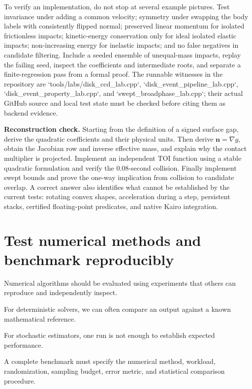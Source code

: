 To verify an implementation, do not stop at several example pictures. Test invariance under adding a common velocity; symmetry under swapping the body labels with consistently flipped normal; preserved linear momentum for isolated frictionless impacts; kinetic-energy conservation only for ideal isolated elastic impacts; non-increasing energy for inelastic impacts; and no false negatives in candidate filtering. Include a seeded ensemble of unequal-mass impacts, replay the failing seed, inspect the coefficients and intermediate roots, and separate a finite-regression pass from a formal proof. The runnable witnesses in the repository are `tools/labs/disk\_ccd\_lab.cpp`, `disk\_event\_pipeline\_lab.cpp`, `disk\_event\_property\_lab.cpp`, and `swept\_broadphase\_lab.cpp`; their actual GitHub source and local test state must be checked before citing them as backend evidence.

\textbf{Reconstruction check.} Starting from the definition of a signed surface gap, derive the quadratic coefficients and their physical units. Then derive \(\mathbf n=\nabla g\), obtain the Jacobian row and inverse effective mass, and explain why the contact multiplier is projected. Implement an independent TOI function using a stable quadratic formulation and verify the 0.08-second collision. Finally implement swept bounds and prove the one-way implication from collision to candidate overlap. A correct answer also identifies what cannot be established by the current tests: rotating convex shapes, acceleration during a step, persistent stacks, certified floating-point predicates, and native Kairo integration.

\section{Test numerical methods and benchmark reproducibly}\label{02-foundations-ii-ch031-test-numerical-methods-and-benchmark-reproducibly}

\hypertarget{02-foundations-ii-ch031-test-numerical-methods-and-benchmark-reproducibly}{}

Numerical algorithms should be evaluated using experiments that others can reproduce and independently inspect.

For deterministic solvers, we can often compare an output against a known mathematical reference.

For stochastic estimators, one run is not enough to establish expected performance.

A complete benchmark must specify the numerical method, workload, randomization, sampling budget, error metric, and statistical comparison procedure.

